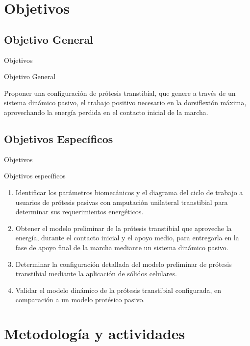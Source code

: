 \documentclass[10pt]{beamer}
\begin{document}
\section{Objetivos}

\subsection{Objetivo General}
\begin{frame}{Objetivos}

\begin{alertblock}{Objetivo General}

Proponer una configuración de prótesis transtibial, que genere a través de un
sistema dinámico pasivo, el trabajo positivo necesario en la dorsiflexión máxima, aprovechando la energía perdida en el contacto inicial de la marcha.
\end{alertblock}
\end{frame}


\subsection{Objetivos Específicos}
\begin{frame}{Objetivos}

\begin{exampleblock}{Objetivos específicos}

\begin{enumerate}
\item \small {Identificar los parámetros biomecánicos y el diagrama del ciclo de trabajo a usuarios de prótesis pasivas con amputación unilateral transtibial para determinar sus requerimientos energéticos.}
\item \small{Obtener el modelo preliminar de la prótesis transtibial que
aproveche la energía, durante el contacto inicial y el apoyo medio,
para entregarla en la fase de apoyo final de la marcha mediante un
sistema dinámico pasivo.}
\item \small{Determinar la configuración detallada del modelo preliminar de prótesis transtibial mediante la aplicación de sólidos celulares.} 
\item \small{Validar el modelo dinámico de la prótesis transtibial configurada, en comparación a un modelo protésico pasivo.}
\end{enumerate}
\end{exampleblock}
\end{frame}


\section{Metodología y actividades}
\end{document}
